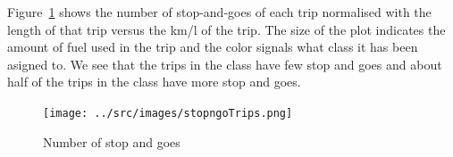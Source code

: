
Figure~\ref{fig:stopngoTrips} shows the number of stop-and-goes of each trip normalised with the length of that trip versus the km/l of the trip.
The size of the plot indicates the amount of fuel used in the trip and the color signals what class it has been asigned to.
We see that the trips in the \fuelHigh class have few stop and goes and about half of the trips in the \fuelMedium class have more stop and goes.

\begin{figure}
\centering
\texttt{[image: ../src/images/stopngoTrips.png]}
\caption{Number of stop and goes}
\label{fig:stopngoTrips}
\end{figure}
